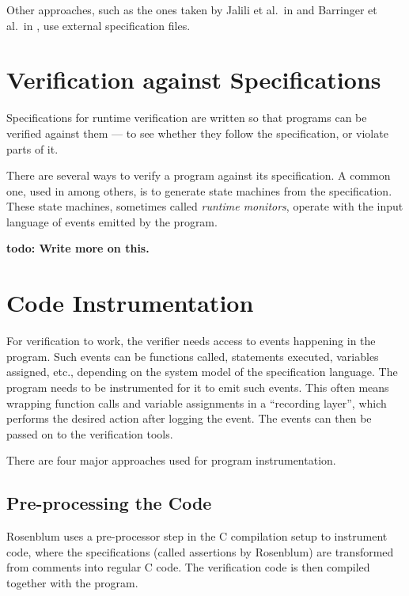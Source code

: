 \documentclass[a4paper,11pt]{kth-mag}
\newcommand{\todo}[1]{\textbf{todo: #1}}
\begin{document}
Other approaches, such as the ones taken by Jalili et al.\ in
\cite{jalili07rverl} and Barringer et al.\ in \cite{barringer03eagle}, use
external specification files.



\section{Verification against Specifications} \label{section-verification}

Specifications for runtime verification are written so that programs can be
verified against them --- to see whether they follow the specification, or
violate parts of it.

There are several ways to verify a program against its specification. A common
one, used in
\cite{bauer06monitoring,bodden05efficientrv,jalili07rverl,barringer03eagle}
among others, is to generate state machines from the specification. These state
machines, sometimes called \textit{runtime monitors}, operate with the input
language of events emitted by the program.

\todo{Write more on this.}


\section{Code Instrumentation} \label{section-instrumentation}

For verification to work, the verifier needs access to events happening in the
program. Such events can be functions called, statements executed, variables
assigned, etc., depending on the system model of the specification language.
The program needs to be instrumented for it to emit such events. This often
means wrapping function calls and variable assignments in a ``recording
layer'', which performs the desired action after logging the event. The events
can then be passed on to the verification tools.

There are four major approaches used for program instrumentation.


\subsection{Pre-processing the Code}

Rosenblum \cite{rosenblum95practicalassertions} uses a pre-processor step in
the C compilation setup to instrument code, where the specifications (called
assertions by Rosenblum) are transformed from comments into regular C code. The
verification code is then compiled together with the program.
\end{document}
